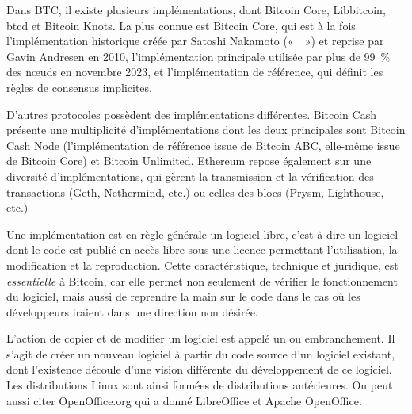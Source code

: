 Dans BTC, il existe plusieurs implémentations, dont Bitcoin Core, Libbitcoin, btcd et Bitcoin Knots. La plus connue est Bitcoin Core, qui est à la fois l'implémentation historique créée par Satoshi Nakamoto («~~») et reprise par Gavin Andresen en 2010, l'implémentation principale utilisée par plus de 99~\% des nœuds en novembre 2023, et l'implémentation de référence, qui définit les règles de consensus implicites.

D'autres protocoles possèdent des implémentations différentes. Bitcoin Cash présente une multiplicité d'implémentations dont les deux principales sont Bitcoin Cash Node (l'implémentation de référence issue de Bitcoin ABC, elle-même issue de Bitcoin Core) et Bitcoin Unlimited. Ethereum repose également sur une diversité d'implémentations, qui gèrent la transmission et la vérification des transactions (Geth, Nethermind, etc.) ou celles des blocs (Prysm, Lighthouse, etc.)

Une implémentation est en règle générale un logiciel libre, c'est-à-dire un logiciel dont le code est publié en accès libre sous une licence permettant l'utilisation, la modification et la reproduction. Cette caractéristique, technique et juridique, est \emph{essentielle} à Bitcoin, car elle permet non seulement de vérifier le fonctionnement du logiciel, mais aussi de reprendre la main sur le code dans le cas où les développeurs iraient dans une direction non désirée. %

L'action de copier et de modifier un logiciel est appelé un  ou embranchement. Il s'agit de créer un nouveau logiciel à partir du code source d'un logiciel existant, dont l'existence découle d'une vision différente du développement de ce logiciel. Les distributions Linux sont ainsi formées de distributions antérieures. On peut aussi citer OpenOffice.org qui a donné LibreOffice et Apache OpenOffice.

